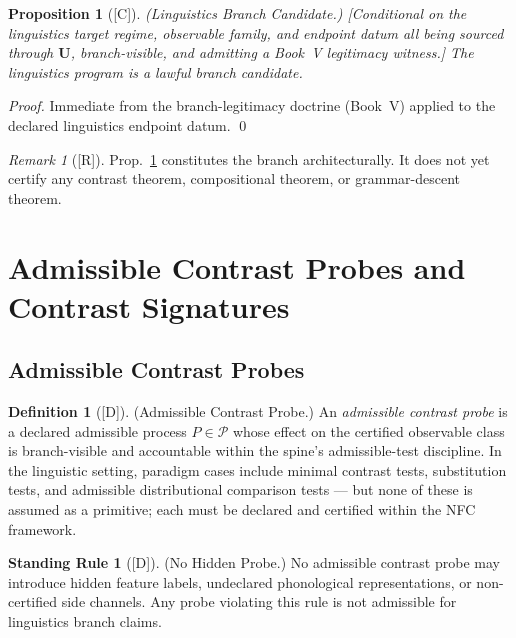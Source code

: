\documentclass[12pt,oneside]{amsbook}
\theoremstyle{plain}
\newtheorem{proposition}[theorem]{Proposition}
\theoremstyle{definition}
\newtheorem{definition}[theorem]{Definition}
\newtheorem{standingrule}[theorem]{Standing Rule}
\theoremstyle{remark}
\newtheorem{remark}[theorem]{Remark}
\newcommand{\status}[1]{\textup{[#1]}}
\begin{document}
\begin{proposition}[\status{C}]\label{prop:ling-branch-candidate}
\textup{(Linguistics Branch Candidate.)}
\textup{[Conditional on the linguistics target regime, observable
family, and endpoint datum all being sourced through $\mathbf{U}$,
branch-visible, and admitting a Book~V legitimacy witness.]}
The linguistics program is a lawful branch candidate.
\end{proposition}

\begin{proof}
Immediate from the branch-legitimacy doctrine (Book~V) applied to the
declared linguistics endpoint datum.
\qed
\end{proof}

\begin{remark}[\status{R}]\label{rem:ling-posture-note}
Prop.~\ref{prop:ling-branch-candidate} constitutes the branch
architecturally. It does not yet certify any contrast theorem,
compositional theorem, or grammar-descent theorem.
\end{remark}

\section{Admissible Contrast Probes and Contrast Signatures}
\label{sec:ling-probes}

\subsection{Admissible Contrast Probes}\label{sec:ling-admissible-probes}

\begin{definition}[\status{D}]\label{def:ling-admissible-probe}
\textup{(Admissible Contrast Probe.)}
An \emph{admissible contrast probe} is a declared admissible process
$P \in \mathcal{P}$ whose effect on the certified observable class is
branch-visible and accountable within the spine's admissible-test
discipline. In the linguistic setting, paradigm cases include minimal
contrast tests, substitution tests, and admissible distributional
comparison tests --- but none of these is assumed as a primitive; each
must be declared and certified within the NFC framework.
\end{definition}

\begin{standingrule}[\status{D}]\label{sr:ling-no-hidden-probe}
\textup{(No Hidden Probe.)}
No admissible contrast probe may introduce hidden feature labels,
undeclared phonological representations, or non-certified side
channels. Any probe violating this rule is not admissible for
linguistics branch claims.
\end{standingrule}
\end{document}
